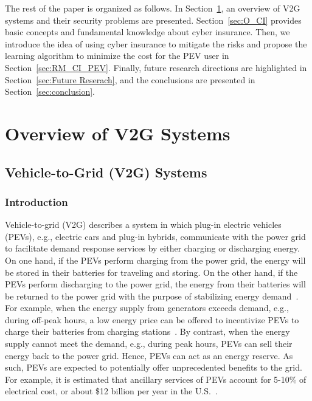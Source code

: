 \documentclass[twocolumn,10pt]{IEEEtran}
\begin{document}
The rest of the paper is organized as follows. In Section~\ref{sec:Overview_V2G}, an overview of V2G systems and their security problems are presented. Section~\ref{sec:O_CI} provides basic concepts and fundamental knowledge about cyber insurance. Then, we introduce the idea of using cyber insurance to mitigate the risks and propose the learning algorithm to minimize the cost for the PEV user in Section~\ref{sec:RM_CI_PEV}. Finally, future research directions are highlighted in Section~\ref{sec:Future Reserach}, and the conclusions are presented in Section~\ref{sec:conclusion}.
\section{Overview of V2G Systems}%
\label{sec:Overview_V2G}


\subsection{Vehicle-to-Grid (V2G) Systems}


\subsubsection{Introduction}

Vehicle-to-grid (V2G) describes a system in which plug-in electric vehicles (PEVs), e.g., electric cars and plug-in hybrids, communicate with the power grid to facilitate demand response services by either charging or discharging energy. On one hand, if the PEVs perform charging from the power grid, the energy will be stored in their batteries for traveling and storing. On the other hand, if the PEVs perform discharging to the power grid, the energy from their batteries will be returned to the power grid with the purpose of stabilizing energy demand~\cite{Wei2014GT-CFS}. For example, when the energy supply from generators exceeds demand, e.g., during off-peak hours, a low energy price can be offered to incentivize PEVs to charge their batteries from charging stations~\cite{Tan2016Pareto}. By contrast, when the energy supply cannot meet the demand, e.g., during peak hours, PEVs can sell their energy back to the power grid. Hence, PEVs can act as an energy reserve. As such, PEVs are expected to potentially offer unprecedented benefits to the grid. For example, it is estimated that ancillary services of PEVs account for 5-10\% of electrical cost, or about \$12 billion per year in the U.S.~\cite{Kempton2005Vehicle}.
\end{document}
